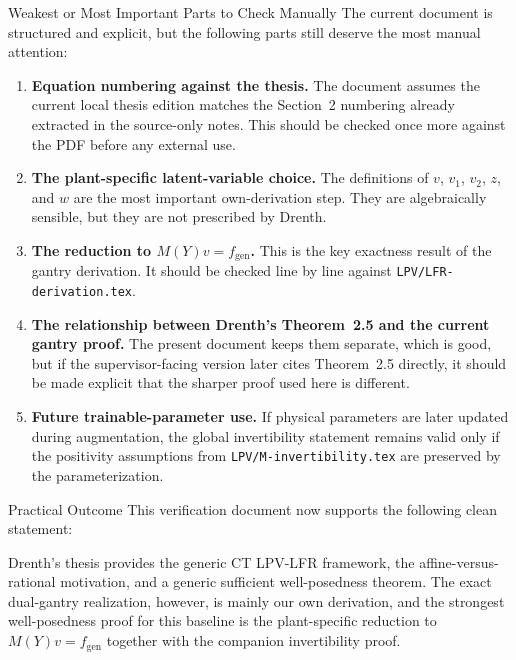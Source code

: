 \documentclass[11pt]{article}
\begin{document}
\begin{warningbox}{Weakest or Most Important Parts to Check Manually}
The current document is structured and explicit, but the following parts still
deserve the most manual attention:
\begin{enumerate}[leftmargin=1.4em,label=\arabic*.]
    \item \textbf{Equation numbering against the thesis.} The document assumes
    the current local thesis edition matches the Section~2 numbering already
    extracted in the source-only notes. This should be checked once more against
    the PDF before any external use.
    \item \textbf{The plant-specific latent-variable choice.} The definitions of
    $v$, $v_1$, $v_2$, $z$, and $w$ are the most important own-derivation step.
    They are algebraically sensible, but they are not prescribed by Drenth.
    \item \textbf{The reduction to $M(Y)v = f_{\mathrm{gen}}$.} This is the key
    exactness result of the gantry derivation. It should be checked line by line
    against \texttt{LPV/LFR-derivation.tex}.
    \item \textbf{The relationship between Drenth's Theorem~2.5 and the current
    gantry proof.} The present document keeps them separate, which is good, but
    if the supervisor-facing version later cites Theorem~2.5 directly, it should
    be made explicit that the sharper proof used here is different.
    \item \textbf{Future trainable-parameter use.} If physical parameters are
    later updated during augmentation, the global invertibility statement remains
    valid only if the positivity assumptions from \texttt{LPV/M-invertibility.tex}
    are preserved by the parameterization.
\end{enumerate}
\end{warningbox}

\begin{resultbox}{Practical Outcome}
This verification document now supports the following clean statement:

Drenth's thesis provides the generic CT LPV-LFR framework, the affine-versus-rational
motivation, and a generic sufficient well-posedness theorem. The exact
dual-gantry realization, however, is mainly our own derivation, and the
strongest well-posedness proof for this baseline is the plant-specific reduction
to $M(Y)v = f_{\mathrm{gen}}$ together with the companion invertibility proof.
\end{resultbox}
\end{document}
